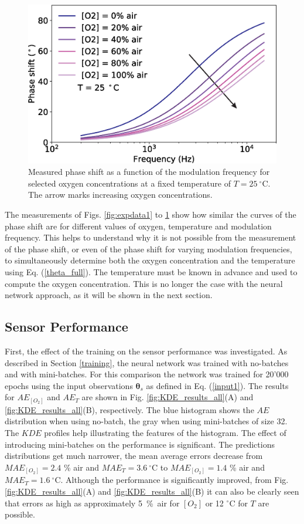 \documentclass[sensors,article,submit,moreauthors,pdftex,10pt,a4paper]{Definitions/mdpi}
\begin{document}
\begin{figure}[t!]
\centering
\includegraphics[width=8.2 cm]{phase_f_O2.eps}
\caption{Measured phase shift as a function of the modulation frequency for selected oxygen concentrations at a fixed temperature of $T=25 \ ^{\circ}$C. The arrow marks increasing oxygen concentrations.}
\label{fig:expdata3}
\end{figure}

The measurements of Figs. \ref{fig:expdata1} to \ref{fig:expdata3} show how similar the curves of the phase shift are for different values of oxygen, temperature and modulation frequency. This helps to understand why it is not possible from the measurement of the phase shift, or even of the phase shift for varying modulation frequencies, to simultaneously determine both the oxygen concentration and the temperature using Eq. (\ref{theta_full}). The temperature must be known in advance and used to compute the oxygen concentration. This is no longer the case with the neural network approach, as it will be shown in the next section. 


\subsection{Sensor Performance}

First, the effect of the training on the sensor performance was investigated. As described in Section \ref{training}, the neural network was trained with no-batches and with mini-batches. For this comparison the network was trained for 20'000 epochs using the input observations ${\pmb \theta}_s$ as defined in Eq. (\ref{input1}). The results for $AE_{[O_2]}$ and $AE_T$ are shown in Fig. \ref{fig:KDE_results_all}(A) and \ref{fig:KDE_results_all}(B), respectively. The blue histogram shows the $AE$ distribution when using no-batch, the gray when using mini-batches of size 32. The $KDE$ profiles help illustrating the features of the histogram. The effect of introducing mini-batches on the performance is significant. The predictions distributions get much narrower, the mean average errors decrease from $MAE_{[O_2]}=2.4$ \% air and $MAE_{T}=3.6 \ ^\circ$C to $MAE_{[O_2]}=1.4$ \% air and $MAE_{T}=1.6 \ ^\circ$C. Although the performance is significantly improved, from Fig. \ref{fig:KDE_results_all}(A) and \ref{fig:KDE_results_all}(B) it can also be clearly seen that errors as high as approximately 5~\%~air for $[O_2]$ or 12 $^\circ$C for $T$ are possible.
\end{document}
